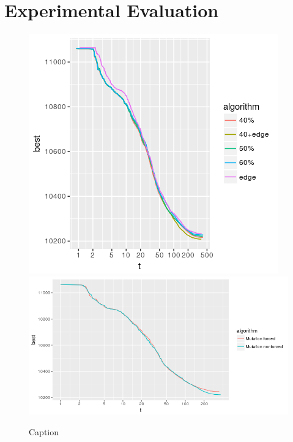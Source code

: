 \documentclass[a4paper,12pt,bibtotoc,titlepage, liststotoc,BCOR7mm,headsepline,pointlessnumbers]{scrbook}
\numberwithin{equation}{section}
\begin{document}
\chapter{Experimental Evaluation}
\begin{figure}[t!] 
    \vspace*{-.25cm}
  \centering
   \includegraphics[width=.8\textwidth]{img/edge frequency.png}
   \includegraphics[width=.8\textwidth]{img/forced_nonforced_mutation.png}

  \caption{Caption}
    \vspace*{-.5cm}
\end{figure}
\end{document}
